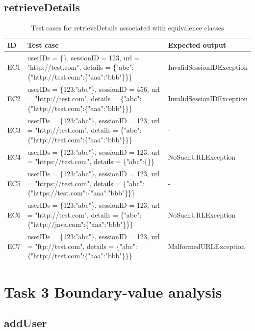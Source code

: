 \documentclass{article}
\begin{document}
\subsection{retrieveDetails}
\begin{longtable}{|p{2cm}|p{7cm}|p{5cm}|}
\caption{Test cases for retrieveDetails associated with equivalence classes}\\
\hline 
ID&Test case&Expected output\\
\hline  
EC1&userIDs = \{\}, sessionID = 123, url = "http://test.com", details = \{"abc":\{"http://test.com":\{"aaa":"bbb"\}\}\}&InvalidSessionIDException\\
\hline
EC2&userIDs = \{123:"abc"\}, sessionID = 456, url = "http://test.com", details = \{"abc":\{"http://test.com":\{"aaa":"bbb"\}\}\}&InvalidSessionIDException\\
\hline
EC3&userIDs = \{123:"abc"\}, sessionID = 123, url = "http://test.com", details = \{"abc":\{"http://test.com":\{"aaa":"bbb"\}\}\}&-\\
\hline
EC4&userIDs = \{123:"abc"\}, sessionID = 123, url = "https://test.com", details = \{"abc":\{\}\}&NoSuchURLException\\
\hline
EC5&userIDs = \{123:"abc"\}, sessionID = 123, url = "https://test.com", details = \{"abc":\{"https://test.com":\{"aaa":"bbb"\}\}\}&-\\
\hline
EC6&userIDs = \{123:"abc"\}, sessionID = 123, url = "http://test.com", details = \{"abc":\{"http://java.com":\{"aaa":"bbb"\}\}\}&NoSuchURLException\\
\hline
EC7&userIDs = \{123:"abc"\}, sessionID = 123, url = "ftp://test.com", details = \{"abc":\{"http://test.com":\{"aaa":"bbb"\}\}\}&MalformedURLException\\
\hline
\end{longtable}

\section{Task 3 Boundary-value analysis}
\subsection{addUser}
\end{document}
